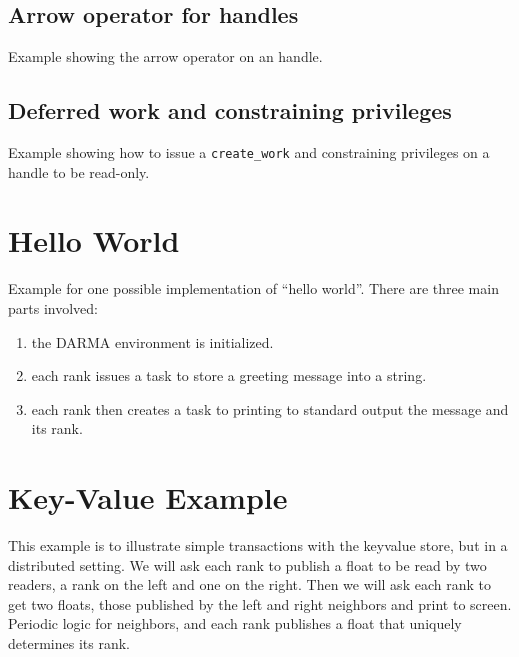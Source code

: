 \subsection{Arrow operator for handles}
Example showing the arrow operator on an handle.


\subsection{Deferred work and constraining privileges}
Example showing how to issue a \texttt{create\_work} and constraining privileges on a handle to be read-only.






\section{Hello World}

Example for one possible implementation of ``hello world''. 
There are three main parts involved: 
\begin{enumerate}
\item the DARMA environment is initialized. 
\item each rank issues a task to store a greeting message into a string.
\item each rank then creates a task to printing to standard output the message and its rank.
\end{enumerate}





\section{Key-Value Example}

This example is to illustrate simple transactions with the keyvalue store, 
but in a distributed setting. We will ask each rank to publish a float to be
read by two readers, a rank on the left and one on the right. Then we will ask
each rank to get two floats, those published by the left and right neighbors
and print to screen. Periodic logic for neighbors, and each rank publishes a 
float that uniquely determines its rank.

